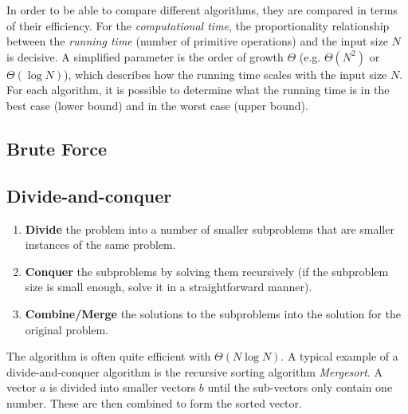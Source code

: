 

In order to be able to compare different algorithms, they are compared in terms of their efficiency. For the \emph{computational time}, the proportionality relationship between the \emph{running time} (number of primitive operations) and the input size $N$ is decisive. A simplified parameter is the order of growth $\Theta$ (e.g. $\Theta(N^2)$ or $\Theta(\log N)$), which describes how the running time scales with the input size $N$. For each algorithm, it is possible to determine what the running time is in the best case (lower bound) and in the worst case (upper bound).

\subsection{Brute Force}




\subsection{Divide-and-conquer}

\begin{enumerate}
    \item \textbf{Divide} the problem into a number of smaller subproblems that are smaller instances of the same problem.
    \item \textbf{Conquer} the subproblems by solving them recursively (if the subproblem size is small enough, solve it in a straightforward manner).
    \item \textbf{Combine/Merge} the solutions to the subproblems into the solution for the original problem.
\end{enumerate}

The algorithm is often quite efficient with $\Theta(N\log N)$. A typical example of a divide-and-conquer algorithm is the recursive sorting algorithm \emph{Mergesort}. A vector $a$ is divided into smaller vectors $b$ until the sub-vectors only contain one number. These are then combined to form the sorted vector.

